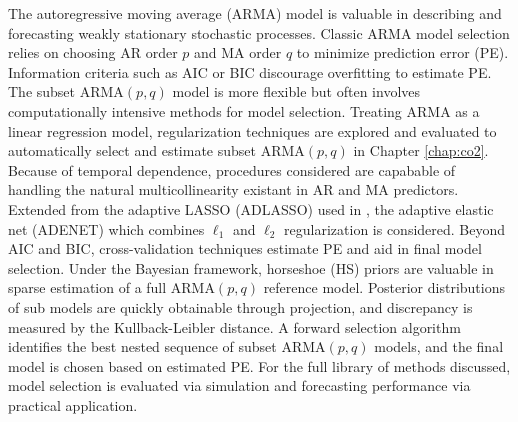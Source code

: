 The autoregressive moving average (ARMA) model is valuable in describing and forecasting weakly stationary stochastic processes. Classic ARMA model selection relies on choosing AR order $p$ and MA order $q$ to minimize prediction error (PE). Information criteria such as AIC or BIC discourage overfitting to estimate PE. The subset ARMA$(p,q)$ model is more flexible but often involves  computationally intensive methods for model selection. Treating ARMA as a linear regression model, regularization techniques are explored and evaluated to automatically select and estimate subset ARMA$(p,q)$ in Chapter \ref{chap:co2}. Because of temporal dependence, procedures considered are capabable of handling the natural multicollinearity existant in AR and MA predictors. Extended from the adaptive LASSO (ADLASSO) used in \cite{Chen2011}, the adaptive elastic net (ADENET) which combines $\ell_1$ and $\ell_2$ regularization is considered. Beyond AIC and BIC, cross-validation techniques estimate PE and aid in final model selection. Under the Bayesian framework, horseshoe (HS) priors are valuable in sparse estimation of a full ARMA$(p,q)$ reference model. Posterior distributions of sub models are quickly obtainable through projection, and discrepancy is measured by the Kullback-Leibler distance. A forward selection algorithm identifies the best nested sequence of subset ARMA$(p,q)$ models, and the final model is chosen based on estimated PE. For the full library of methods discussed, model selection is evaluated via simulation and forecasting performance via practical application.